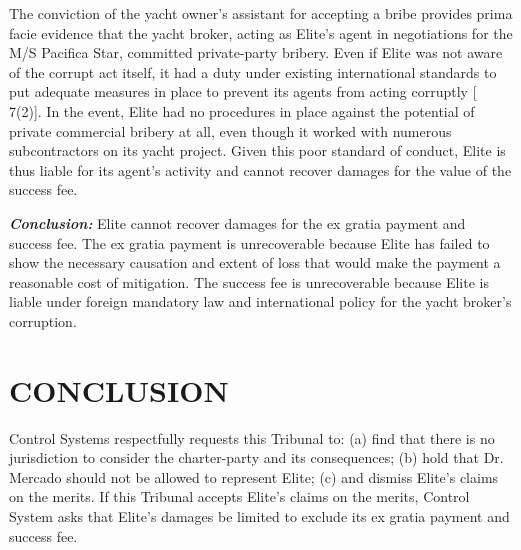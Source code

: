 The conviction of the yacht owner's assistant for accepting a bribe provides prima facie evidence that the yacht broker, acting as Elite's agent in negotiations for the M/S Pacifica Star, committed private-party bribery.  Even if Elite was not aware of the corrupt act itself, it had a duty under existing international standards to put adequate measures in place to prevent its agents from acting corruptly [\seeeg \cite{Bribery Act} 7(2)].  In the event, Elite had no procedures in place against the potential of private commercial bribery at all, even though it worked with numerous subcontractors on its yacht project.  Given this poor standard of conduct, Elite is thus liable for its agent's activity and cannot recover damages for the value of the success fee.

\textbf{\textit{Conclusion:}} Elite cannot recover damages for the ex gratia payment and success fee. The ex gratia payment is unrecoverable because Elite has failed to show the necessary causation and extent of loss that would make the payment a reasonable cost of mitigation. The success fee is unrecoverable because Elite is liable under foreign mandatory law and international policy for the yacht broker's corruption.

\section{CONCLUSION}

Control Systems respectfully requests this Tribunal to: (a) find that there is no jurisdiction to consider the charter-party and its consequences; (b) hold that Dr. Mercado should not be allowed to represent Elite; (c) and dismiss Elite's claims on the merits. If this Tribunal accepts Elite's claims on the merits, Control System asks that Elite's damages be limited to exclude its ex gratia payment and success fee.


